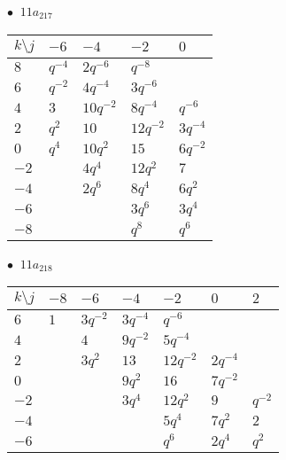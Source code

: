 \begin{minipage}{\linewidth}
$\bullet\ $ $11a_{217}$ \vspace{0.5em} \\
\begin{tabular}{l|llll}
$k \setminus j$ & $-6$ & $-4$ & $-2$ & $0$ \\
\hline
$8$ & $q^{-4}$ & $2q^{-6}$ & $q^{-8}$ &  \\
$6$ & $q^{-2}$ & $4q^{-4}$ & $3q^{-6}$ &  \\
$4$ & $3$ & $10q^{-2}$ & $8q^{-4}$ & $q^{-6}$ \\
$2$ & $q^{2}$ & $10$ & $12q^{-2}$ & $3q^{-4}$ \\
$0$ & $q^{4}$ & $10q^{2}$ & $15$ & $6q^{-2}$ \\
$-2$ &  & $4q^{4}$ & $12q^{2}$ & $7$ \\
$-4$ &  & $2q^{6}$ & $8q^{4}$ & $6q^{2}$ \\
$-6$ &  &  & $3q^{6}$ & $3q^{4}$ \\
$-8$ &  &  & $q^{8}$ & $q^{6}$ \\
\end{tabular}
\vspace{2em}
\end{minipage}
%
\begin{minipage}{\linewidth}
$\bullet\ $ $11a_{218}$ \vspace{0.5em} \\
\begin{tabular}{l|llllll}
$k \setminus j$ & $-8$ & $-6$ & $-4$ & $-2$ & $0$ & $2$ \\
\hline
$6$ & $1$ & $3q^{-2}$ & $3q^{-4}$ & $q^{-6}$ &  &  \\
$4$ &  & $4$ & $9q^{-2}$ & $5q^{-4}$ &  &  \\
$2$ &  & $3q^{2}$ & $13$ & $12q^{-2}$ & $2q^{-4}$ &  \\
$0$ &  &  & $9q^{2}$ & $16$ & $7q^{-2}$ &  \\
$-2$ &  &  & $3q^{4}$ & $12q^{2}$ & $9$ & $q^{-2}$ \\
$-4$ &  &  &  & $5q^{4}$ & $7q^{2}$ & $2$ \\
$-6$ &  &  &  & $q^{6}$ & $2q^{4}$ & $q^{2}$ \\
\end{tabular}
\vspace{2em}
\end{minipage}
%

